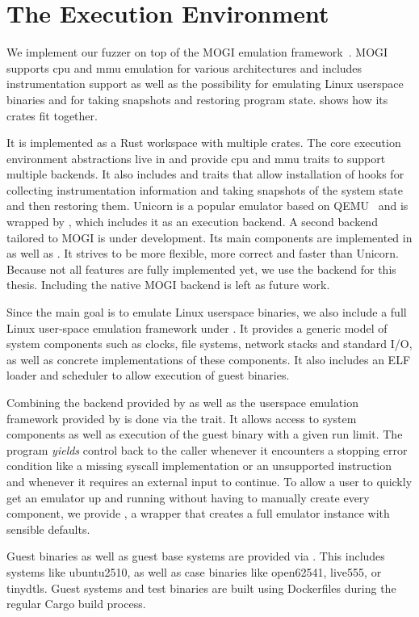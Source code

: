 
\section{The Execution Environment}\label{sec:impl-platform}

We implement our fuzzer on top of the MOGI emulation framework~\cite{giraud_l-scale_2026}.
MOGI supports \gls{cpu} and \gls{mmu} emulation for various architectures and includes
instrumentation support as well as the possibility for emulating Linux userspace
binaries and for taking snapshots and restoring program state.
 shows how its crates fit together.



It is implemented as a Rust workspace with multiple crates.
The core execution environment abstractions live in  and provide
\gls{cpu} and \gls{mmu} traits to support multiple backends.
It also includes  and  traits that allow installation
of hooks for collecting instrumentation information and taking snapshots of the system
state and then restoring them.
Unicorn is a popular emulator based on QEMU~\cite{bellard_qemu_2005} and is
wrapped by , which includes it as an execution backend.
A second backend tailored to MOGI is under development.
Its main components are implemented in  as well as .
It strives to be more flexible, more correct and faster than Unicorn.
Because not all features are fully implemented yet, we use the
 backend for this thesis.
Including the native MOGI backend is left as future work.

Since the main goal is to emulate Linux userspace binaries, we also include a full Linux
user-space emulation framework under .
It provides a generic model of system components such as clocks, file systems,
network stacks and standard I/O, as well as concrete implementations of these components.
It also includes an ELF loader and scheduler to allow execution of guest binaries.

Combining the backend provided by  as well as the userspace
emulation framework provided by  is done via the 
trait.
It allows access to system components as well as execution of the guest binary with
a given run limit.
The program \emph{yields} control back to the caller whenever it encounters a stopping
error condition like a missing syscall implementation or an unsupported instruction and
whenever it requires an external input to continue.
To allow a user to quickly get an emulator up and running without having to manually
create every component, we provide , a wrapper that creates
a full emulator instance with sensible defaults.

Guest binaries as well as guest base systems are provided via .
This includes systems like ubuntu2510, as well as case binaries like open62541,
live555, or tinydtls.
Guest systems and test binaries are built using Dockerfiles during the regular Cargo
build process.
